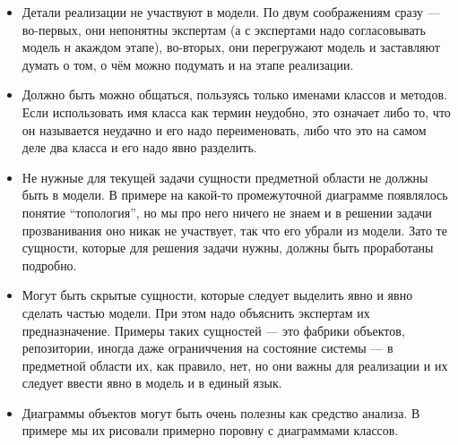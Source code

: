 \documentclass[a5paper]{article}
\begin{document}
\begin{itemize}
	\item Детали реализации не участвуют в модели. По двум соображениям сразу --- во-первых, они непонятны экспертам (а с экспертами надо согласовывать модель н акаждом этапе), во-вторых, они перегружают модель и заставляют думать о том, о чём можно подумать и на этапе реализации.
	\item Должно быть можно общаться, пользуясь только именами классов и методов. Если использовать имя класса как термин неудобно, это означает либо то, что он называется неудачно и его надо переименовать, либо что это на самом деле два класса и его надо явно разделить.
	\item Не нужные для текущей задачи сущности предметной области не должны быть в модели. В примере на какой-то промежуточной диаграмме появлялось понятие ``топология'', но мы про него ничего не знаем и в решении задачи прозванивания оно никак не участвует, так что его убрали из модели. Зато те сущности, которые для решения задачи нужны, должны быть проработаны подробно.
	\item Могут быть скрытые сущности, которые следует выделить явно и явно сделать частью модели. При этом надо объяснить экспертам их предназначение. Примеры таких сущностей --- это фабрики объектов, репозитории, иногда даже ограниччения на состояние системы --- в предметной области их, как правило, нет, но они важны для реализации и их следует ввести явно в модель и в единый язык.
	\item Диаграммы объектов могут быть очень полезны как средство анализа. В примере мы их рисовали примерно поровну с диаграммами классов.
\end{itemize}
\end{document}
